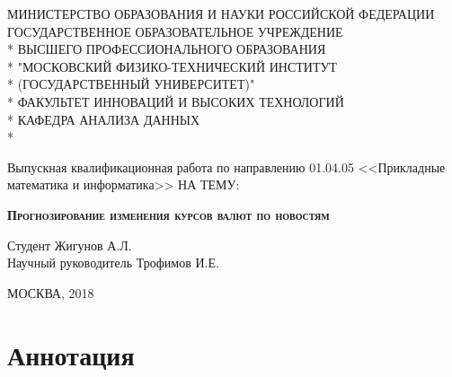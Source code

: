 \documentclass[pdftex,14pt,a4paper]{extreport}
\begin{document}
\begin{titlepage}

\newpage

\begin{center}
МИНИСТЕРСТВО ОБРАЗОВАНИЯ И НАУКИ РОССИЙСКОЙ ФЕДЕРАЦИИ \\
\vspace{0.5cm}
ГОСУДАРСТВЕННОЕ ОБРАЗОВАТЕЛЬНОЕ УЧРЕЖДЕНИЕ \\*
ВЫСШЕГО ПРОФЕССИОНАЛЬНОГО ОБРАЗОВАНИЯ\\*
"МОСКОВСКИЙ ФИЗИКО-ТЕХНИЧЕСКИЙ ИНСТИТУТ \\*
(ГОСУДАРСТВЕННЫЙ УНИВЕРСИТЕТ)" \\*
\vspace{0.5cm}
ФАКУЛЬТЕТ ИННОВАЦИЙ И ВЫСОКИХ ТЕХНОЛОГИЙ \\*
КАФЕДРА АНАЛИЗА ДАННЫХ \\*
\hrulefill
\end{center}


\vspace{4em}

\begin{center}
\Large Выпускная квалификационная работа по направлению 01.04.05 <<Прикладные математика и информатика>> \linebreak НА ТЕМУ:
\end{center}

\vspace{2.5em}

\begin{center}
\textsc{\large{\textbf{Прогнозирование изменения курсов валют по новостям}}}
\end{center}


\begin{flushleft}
Студент \hrulefill Жигунов А.Л. \\
\vspace{1.5em}
Научный руководитель \hrulefill Трофимов И.Е.\\
\end{flushleft}

\vspace{\fill}

\begin{center}
МОСКВА, 2018
\end{center}

\end{titlepage}

\section{Аннотация}
\end{document}
